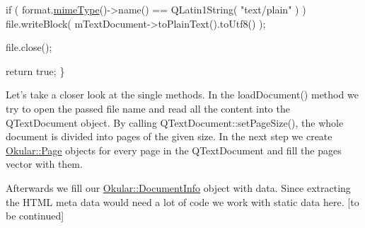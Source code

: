 \begin{DoxyCode}
    \textcolor{keywordflow}{if} ( format.\hyperlink{classOkular_1_1ExportFormat_ab37ac9aa0c65cdff5e9666e1390d79de}{mimeType}()->name() == QLatin1String( \textcolor{stringliteral}{"text/plain"} ) )
        file.writeBlock( mTextDocument->toPlainText().toUtf8() );

    file.close();

    \textcolor{keywordflow}{return} \textcolor{keyword}{true};
\}
\end{DoxyCode}


Let's take a closer look at the single methods. In the load\+Document() method we try to open the passed file name and read all the content into the Q\+Text\+Document object. By calling Q\+Text\+Document\+::set\+Page\+Size(), the whole document is divided into pages of the given size. In the next step we create \hyperlink{classOkular_1_1Page}{Okular\+::\+Page} objects for every page in the Q\+Text\+Document and fill the pages vector with them.

Afterwards we fill our \hyperlink{classOkular_1_1DocumentInfo}{Okular\+::\+Document\+Info} object with data. Since extracting the H\+T\+M\+L meta data would need a lot of code we work with static data here. \mbox{[}to be continued\mbox{]} 